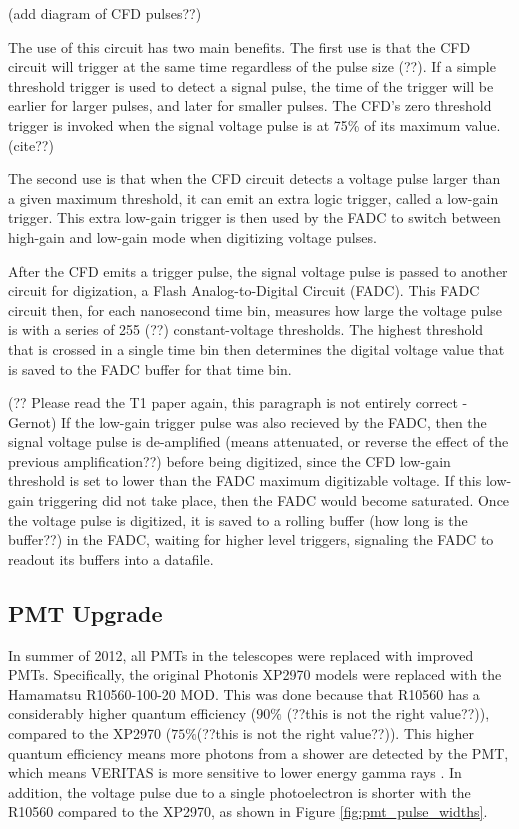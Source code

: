 {\color{red}(add diagram of CFD pulses??)}

The use of this circuit has two main benefits.
{\color{red} The first use is that the CFD circuit will trigger at the same time regardless of the pulse size (??).}
If a simple threshold trigger is used to detect a signal pulse, the time of the trigger will be earlier for larger pulses, and later for smaller pulses.
The CFD's zero threshold trigger is invoked when the signal voltage pulse is at 75\% of its maximum value. {\color{red}(cite??)}

The second use is that when the CFD circuit detects a voltage pulse larger than a given maximum threshold, it can emit an extra logic trigger, called a low-gain trigger.
This extra low-gain trigger is then used by the FADC to switch between high-gain and low-gain mode when digitizing voltage pulses.




After the CFD emits a trigger pulse, the signal voltage pulse is passed to another circuit for digization, a Flash Analog-to-Digital Circuit (FADC).
This FADC circuit then, for each nanosecond time bin, measures how large the voltage pulse is with a series of 255 {\color{red}(??)} constant-voltage thresholds.
The highest threshold that is crossed in a single time bin then determines the digital voltage value that is saved to the FADC buffer for that time bin.

{\color{red}(?? Please read the T1 paper again, this paragraph is not entirely correct -Gernot)}
If the low-gain trigger pulse was also recieved by the FADC, then the signal voltage pulse is de-amplified {\color{red}(means attenuated, or reverse the effect of the previous amplification??)} before being digitized, since the CFD low-gain threshold is set to lower than the FADC maximum digitizable voltage.
If this low-gain triggering did not take place, then the FADC would become saturated.
Once the voltage pulse is digitized, it is saved to a rolling buffer {\color{red}(how long is the buffer??)} in the FADC, waiting for higher level triggers, signaling the FADC to readout its buffers into a datafile.

\subsection{PMT Upgrade}
In summer of 2012, all PMTs in the telescopes were replaced with improved PMTs.
Specifically, the original Photonis XP2970 models were replaced with the Hamamatsu R10560-100-20 MOD.
This was done because that R10560 has a considerably higher quantum efficiency (\nicetilde$90\%$ {\color{red}(??this is not the right value??)}), compared to the XP2970 (\nicetilde$75\%${\color{red}(??this is not the right value??)}).
This higher quantum efficiency means more photons from a shower are detected by the PMT, which means VERITAS is more sensitive to lower energy gamma rays \cite{pmtmodels}.
In addition, the voltage pulse due to a single photoelectron is shorter with the R10560 compared to the XP2970, as shown in Figure \ref{fig:pmt_pulse_widths}.

